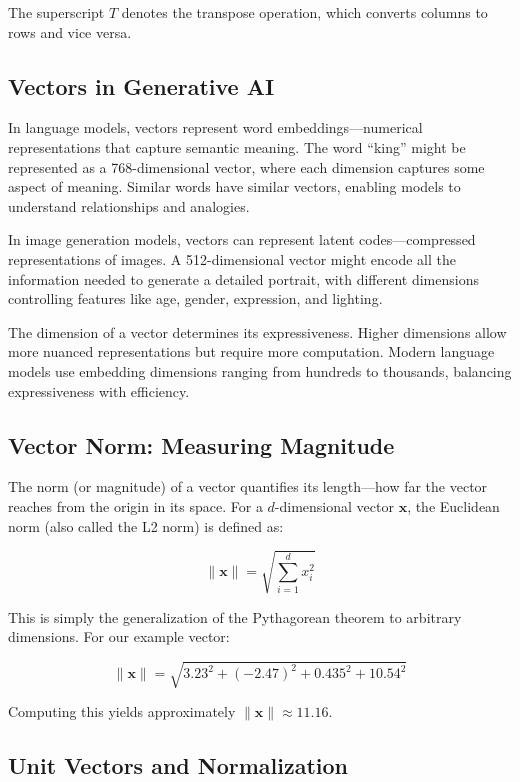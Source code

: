 \documentclass{book}
\begin{document}
The superscript $T$ denotes the transpose operation, which converts columns to rows and vice versa.

\subsection{Vectors in Generative AI}

In language models, vectors represent word embeddings—numerical representations that capture semantic meaning. The word ``king'' might be represented as a 768-dimensional vector, where each dimension captures some aspect of meaning. Similar words have similar vectors, enabling models to understand relationships and analogies.

In image generation models, vectors can represent latent codes—compressed representations of images. A 512-dimensional vector might encode all the information needed to generate a detailed portrait, with different dimensions controlling features like age, gender, expression, and lighting.

The dimension of a vector determines its expressiveness. Higher dimensions allow more nuanced representations but require more computation. Modern language models use embedding dimensions ranging from hundreds to thousands, balancing expressiveness with efficiency.

\subsection{Vector Norm: Measuring Magnitude} \label{subsec:vector_norm}

The norm (or magnitude) of a vector quantifies its length—how far the vector reaches from the origin in its space. For a $d$-dimensional vector $\mathbf{x}$, the Euclidean norm (also called the L2 norm) is defined as:

\begin{equation}
\|\mathbf{x}\| = \sqrt{\sum_{i=1}^{d} x_i^2}
\end{equation}

This is simply the generalization of the Pythagorean theorem to arbitrary dimensions. For our example vector:

\begin{equation}
\|\mathbf{x}\| = \sqrt{3.23^2 + (-2.47)^2 + 0.435^2 + 10.54^2}
\end{equation}

Computing this yields approximately $\|\mathbf{x}\| \approx 11.16$.

\subsection{Unit Vectors and Normalization}
\end{document}
